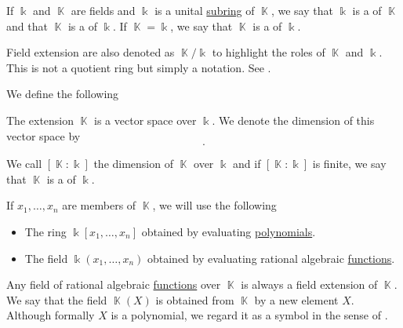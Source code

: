 \begin{definition}\label{def:field_extension}
  If \( \Bbbk \) and \( \BbbK \) are fields and \( \Bbbk \) is a unital \hyperref[def:first_order_substructure]{subring} of \( \BbbK \), we say that \( \Bbbk \) is a  of \( \BbbK \) and that \( \BbbK \) is a  of \( \Bbbk \). If \( \BbbK = \Bbbk \), we say that \( \BbbK \) is a  of \( \Bbbk \).

  Field extension are also denoted as \( \BbbK / \Bbbk \) to highlight the roles of \( \BbbK \) and \( \Bbbk \). This is not a quotient ring but simply a notation. See .

  We define the following
  \begin{thmenum}
     The extension \( \BbbK \) is a vector space over \( \Bbbk \). We denote the dimension of this vector space by
    \begin{equation*}
      [\BbbK : \Bbbk].
    \end{equation*}

    We call \( [\BbbK : \Bbbk] \) the dimension of \( \BbbK \) over \( \Bbbk \) and if \( [\BbbK : \Bbbk] \) is finite, we say that \( \BbbK \) is a  of \( \Bbbk \).

     If \( x_1, \ldots, x_n \) are members of \( \BbbK \), we will use the following
    \begin{itemize}
      \item The ring \( \Bbbk[x_1, \ldots, x_n] \) obtained by evaluating \hyperref[thm:polynomial_ring_universal_property]{polynomials}.
      \item The field \( \Bbbk(x_1, \ldots, x_n) \) obtained by evaluating rational algebraic \hyperref[def:rational_algebraic_function]{functions}.
    \end{itemize}
  \end{thmenum}
\end{definition}

\begin{remark}\label{rem:adjoint_extension_field}
  Any field of rational algebraic \hyperref[def:rational_algebraic_function]{functions} over \( \BbbK \) is always a field extension of \( \BbbK \). We say that the field \( \BbbK(X) \) is obtained from \( \BbbK \) by  a new element \( X \). Although formally \( X \) is a polynomial, we regard it as a symbol in the sense of .
\end{remark}

